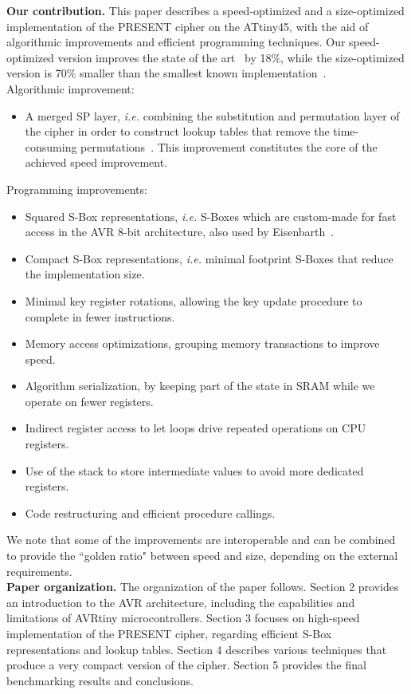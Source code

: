 \documentclass[11pt]{llncs2e} %
\begin{document}
\textbf{Our contribution.} This paper describes a speed-optimized and a size-optimized implementation of the PRESENT cipher on the ATtiny45, with the aid of algorithmic improvements and efficient programming techniques. Our speed-optimized version improves the state of the art~\cite{eisenbarth2012compact} by 18\%, while the size-optimized version is 70\% smaller than the smallest known implementation~\cite{eisenbarth2012compact}.\\
Algorithmic improvement:
\begin{itemize}[nolistsep]
  \item A merged SP layer, \emph{i.e.} combining the substitution and permutation layer of the cipher in order to construct lookup tables that remove the time-consuming permutations~\cite{gong_code}. This improvement constitutes the core of the achieved speed improvement.
\end{itemize}
Programming improvements:
\begin{itemize}[nolistsep]
  \item Squared S-Box representations, \emph{i.e.} S-Boxes which are custom-made for fast access in the AVR 8-bit architecture, also used by Eisenbarth~\cite{eisenbarth2012compact}.
  \item Compact S-Box representations, \emph{i.e.} minimal footprint S-Boxes that reduce the implementation size.
  \item Minimal key register rotations, allowing the key update procedure to complete in fewer instructions.
  \item Memory access optimizations, grouping memory transactions to improve speed.
  \item Algorithm serialization, by keeping part of the state in SRAM while we operate on fewer registers.
  \item Indirect register access to let loops drive repeated operations on CPU registers.
  \item Use of the stack to store intermediate values to avoid more dedicated registers.
  \item Code restructuring and efficient procedure callings.
\end{itemize}
We note that some of the improvements are interoperable and can be combined to provide the ``golden ratio" between speed and size, depending on the external requirements.\\
\textbf{Paper organization.} The organization of the paper follows. Section 2 provides an introduction to the AVR architecture, including the capabilities and limitations of AVRtiny microcontrollers. Section 3 focuses on high-speed implementation of the PRESENT cipher, regarding efficient S-Box representations and lookup tables. Section 4 describes various techniques that produce a very compact version of the cipher. Section 5 provides the final benchmarking results and conclusions.
\end{document}
